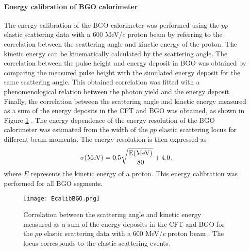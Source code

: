 \vspace{10pt}
\paragraph{Energy calibration of BGO calorimeter}
\label{sec-EcalibBGO}
The energy calibration of the BGO calorimeter was performed using the $pp$ elastic scattering data with a 600 MeV/$c$ proton beam by referring to the correlation between the scattering angle and kinetic energy of the proton. The kinetic energy can be kinematically calculated by the scattering angle. The correlation between the pulse height and energy deposit in BGO was obtained by comparing the measured pulse height with the simulated energy deposit for the same scattering angle. This obtained correlation was fitted with a phenomenological relation between the photon yield and the energy deposit. %
Finally, the correlation between the scattering angle and kinetic energy measured as a sum of the energy deposits in the CFT and BGO was obtained, as shown in Figure \ref{fig-EcalibBGO} \cite{Miwa-SMp}. The energy dependence of the energy resolution of the BGO calorimeter was estimated from the width of the $pp$ elastic scattering locus for different beam momenta. The energy resolution is then expressed as
\begin{equation}
  \sigma (\rm{MeV}) = 0.5 \sqrt{\frac{E(\rm{MeV})}{80}} + 4.0,
\end{equation}
where $E$ represents the kinetic energy of a proton. This energy calibration was performed for all BGO segments.

\begin{figure}[!h]
  \begin{center}
    \texttt{[image: EcalibBGO.png]}
    \caption{Correlation between the scattering angle and kinetic energy measured as a sum of the energy deposits in the CFT and BGO for the $pp$ elastic scattering data with a 600 MeV/$c$ proton beam \cite{Miwa-SMp}. The locus corresponds to the elastic scattering events.}
    \label{fig-EcalibBGO}
  \end{center}
\end{figure}


\vspace{10pt}
